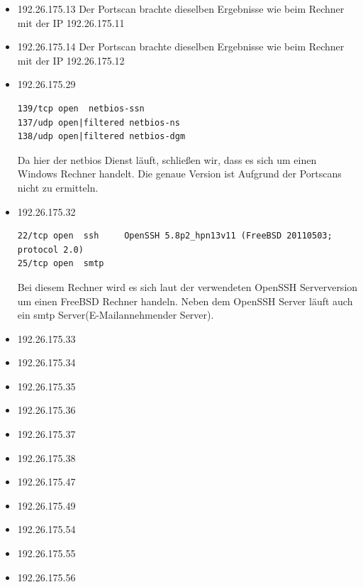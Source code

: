 \documentclass[10pt,a4paper]{article}
\begin{document}
\begin{itemize}
\item 192.26.175.13
Der Portscan brachte dieselben Ergebnisse wie beim Rechner mit der IP 192.26.175.11
\item 192.26.175.14
Der Portscan brachte dieselben Ergebnisse wie beim Rechner mit der IP 192.26.175.12
\item 192.26.175.29
\begin{verbatim}
139/tcp open  netbios-ssn
137/udp open|filtered netbios-ns
138/udp open|filtered netbios-dgm
\end{verbatim}
Da hier der netbios Dienst läuft, schließen wir, dass es sich um einen Windows Rechner handelt. Die genaue Version ist Aufgrund der Portscans nicht zu ermitteln.
\item 192.26.175.32
\begin{verbatim}
22/tcp open  ssh     OpenSSH 5.8p2_hpn13v11 (FreeBSD 20110503; protocol 2.0)
25/tcp open  smtp
\end{verbatim}
Bei diesem Rechner wird es sich laut der verwendeten OpenSSH Serverversion um einen FreeBSD Rechner handeln. Neben dem OpenSSH Server läuft auch ein smtp Server(E-Mailannehmender Server). 
\item 192.26.175.33
\item 192.26.175.34
\item 192.26.175.35
\item 192.26.175.36
\item 192.26.175.37
\item 192.26.175.38
\item 192.26.175.47
\item 192.26.175.49
\item 192.26.175.54
\item 192.26.175.55
\item 192.26.175.56
\end{itemize}
\end{document}
